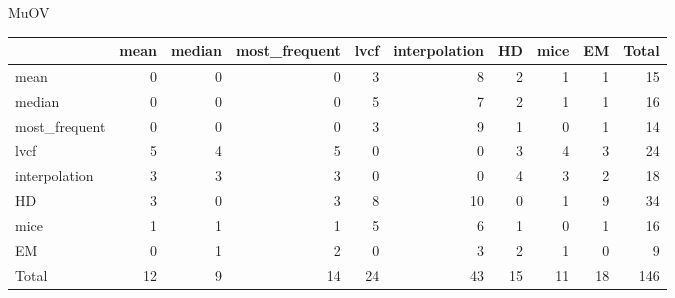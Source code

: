 \documentclass{article}
\begin{document}
{\large MuOV}
\begin{tabular}{lrrrrrrrrr}
\hline
               &   mean &   median &   most\_frequent &   lvcf &   interpolation &   HD &   mice &   EM &   Total \\
\hline
 mean          &      0 &        0 &               0 &      3 &               8 &    2 &      1 &    1 &      15 \\
 median        &      0 &        0 &               0 &      5 &               7 &    2 &      1 &    1 &      16 \\
 most\_frequent &      0 &        0 &               0 &      3 &               9 &    1 &      0 &    1 &      14 \\
 lvcf          &      5 &        4 &               5 &      0 &               0 &    3 &      4 &    3 &      24 \\
 interpolation &      3 &        3 &               3 &      0 &               0 &    4 &      3 &    2 &      18 \\
 HD            &      3 &        0 &               3 &      8 &              10 &    0 &      1 &    9 &      34 \\
 mice          &      1 &        1 &               1 &      5 &               6 &    1 &      0 &    1 &      16 \\
 EM            &      0 &        1 &               2 &      0 &               3 &    2 &      1 &    0 &       9 \\
 Total         &     12 &        9 &              14 &     24 &              43 &   15 &     11 &   18 &     146 \\
\hline
\end{tabular}
\vspace{.5cm}

\centering
\end{document}
